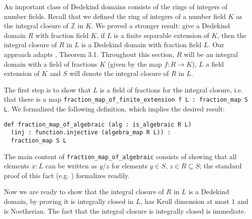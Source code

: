 \documentclass[a4paper,USenglish,cleveref, autoref, thm-restate]{lipics-v2021}
\newcommand{\lean}[1]{\texttt{#1}\xspace} %
\newcommand{\Z}{\mathbb{Z}}
\begin{document}
An important class of Dedekind domains consists of the rings of integers of number fields.%
Recall that we defined the ring of integers of a number field $K$ as the integral closure of $\Z$ in $K$.
We proved a stronger result: give a Dedekind domain $R$ with fraction field $K$, if $L$ is a finite separable extension of $K$, then the integral closure of $R$ in $L$ is a Dedekind domain with fraction field $L$.
Our approach adapts \cite{Neukirch}, Theorem 3.1.
Throughout this section, $R$ will be an integral domain with a field of fractions $K$ (given by the map $f \colon R \to K$), $L$ a field extension of $K$ and $S$ will denote the integral closure of $R$ in $L$.

The first step is to show that $L$ is a field of fractions for the integral closure,
i.e. that there is a map \lean{fraction\_map\_of\_finite\_extension f L : fraction\_map S L}.
We formalized the following definition, which implies the desired result:
\begin{lstlisting}
def fraction_map_of_algebraic (alg : is_algebraic R L)
  (inj : function.injective (algebra_map R L)) :
  fraction_map S L
\end{lstlisting}
The main content of \lean{fraction\_map\_of\_algebraic} consists of showing that all elements $x : L$ can be written as $y / z$ for elements $y \in S$, $z \in R \subseteq S$;
the standard proof of this fact (e.g. \cite[Theorem 15.29]{Dummit-and-Foote}) formalizes readily.

Now we are ready to show that the integral closure of $R$ in $L$ is a Dedekind domain,
by proving it is integrally closed in $L$, has Krull dimension at most $1$ and is Noetherian.
The fact that the integral closure is integrally closed is immediate.
\end{document}
